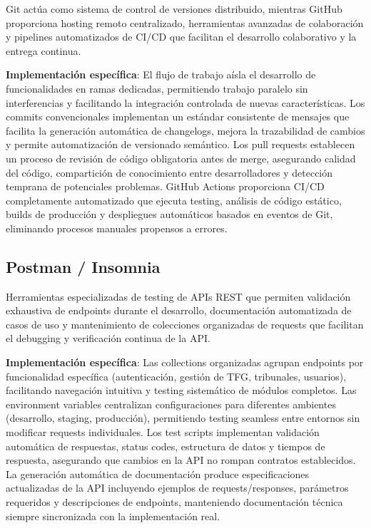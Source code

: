 \documentclass[12pt,a4paper,oneside]{report}
\begin{document}
Git actúa como sistema de control de versiones distribuido, mientras GitHub proporciona hosting remoto centralizado, herramientas avanzadas de colaboración y pipelines automatizados de CI/CD que facilitan el desarrollo colaborativo y la entrega continua.

\textbf{Implementación específica}: El flujo de trabajo aísla el desarrollo de funcionalidades en ramas dedicadas, permitiendo trabajo paralelo sin interferencias y facilitando la integración controlada de nuevas características. Los commits convencionales implementan un estándar consistente de mensajes que facilita la generación automática de changelogs, mejora la trazabilidad de cambios y permite automatización de versionado semántico. Los pull requests establecen un proceso de revisión de código obligatoria antes de merge, asegurando calidad del código, compartición de conocimiento entre desarrolladores y detección temprana de potenciales problemas. GitHub Actions proporciona CI/CD completamente automatizado que ejecuta testing, análisis de código estático, builds de producción y despliegues automáticos basados en eventos de Git, eliminando procesos manuales propensos a errores.

\subsection{Postman / Insomnia}\label{postman-insomnia}

Herramientas especializadas de testing de APIs REST que permiten validación exhaustiva de endpoints durante el desarrollo, documentación automatizada de casos de uso y mantenimiento de colecciones organizadas de requests que facilitan el debugging y verificación continua de la API.

\textbf{Implementación específica}: Las collections organizadas agrupan endpoints por funcionalidad específica (autenticación, gestión de TFG, tribunales, usuarios), facilitando navegación intuitiva y testing sistemático de módulos completos. Las environment variables centralizan configuraciones para diferentes ambientes (desarrollo, staging, producción), permitiendo testing seamless entre entornos sin modificar requests individuales. Los test scripts implementan validación automática de respuestas, status codes, estructura de datos y tiempos de respuesta, asegurando que cambios en la API no rompan contratos establecidos. La generación automática de documentación produce especificaciones actualizadas de la API incluyendo ejemplos de requests/responses, parámetros requeridos y descripciones de endpoints, manteniendo documentación técnica siempre sincronizada con la implementación real.
\end{document}
